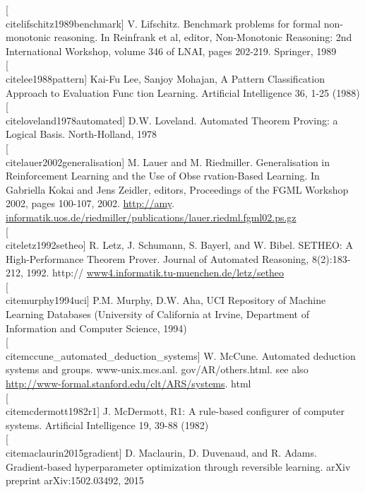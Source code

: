 \documentclass[10pt]{book}
\begin{document}
[\\cite{lifschitz1989benchmark}] V. Lifschitz. Benchmark problems for formal non-monotonic reasoning. In Reinfrank et al, editor, Non-Monotonic Reasoning: 2nd International Workshop, volume 346 of LNAI, pages 202-219. Springer, 1989\\[0pt]
[\\cite{lee1988pattern}] Kai-Fu Lee, Sanjoy Mohajan, A Pattern Classification Approach to Evaluation Func tion Learning. Artificial Intelligence 36, 1-25 (1988)\\[0pt]
[\\cite{loveland1978automated}] D.W. Loveland. Automated Theorem Proving: a Logical Basis. North-Holland, 1978\\[0pt]
[\\cite{lauer2002generalisation}] M. Lauer and M. Riedmiller. Generalisation in Reinforcement Learning and the Use of Obse rvation-Based Learning. In Gabriella Kokai and Jens Zeidler, editors, Proceedings of the FGML Workshop 2002, pages 100-107, 2002. \href{http://amy}{http://amy}. \href{http://informatik.uos.de/riedmiller/publications/lauer.riedml.fgml02.ps.gz}{informatik.uos.de/riedmiller/publications/lauer.riedml.fgml02.ps.gz}\\[0pt]
[\\cite{letz1992setheo}] R. Letz, J. Schumann, S. Bayerl, and W. Bibel. SETHEO: A High-Performance Theorem Prover. Journal of Automated Reasoning, 8(2):183-212, 1992. http:// \href{http://www4.informatik.tu-muenchen.de/letz/setheo}{www4.informatik.tu-muenchen.de/letz/setheo}\\[0pt]
[\\cite{murphy1994uci}] P.M. Murphy, D.W. Aha, UCI Repository of Machine Learning Databases (University of California at Irvine, Department of Information and Computer Science, 1994)\\[0pt]
[\\cite{mccune_automated_deduction_systems}] W. McCune. Automated deduction systems and groups. www-unix.mcs.anl. gov/AR/others.html. see also \href{http://www-formal.stanford.edu/clt/ARS/systems}{http://www-formal.stanford.edu/clt/ARS/systems}. html\\[0pt]
[\\cite{mcdermott1982r1}] J. McDermott, R1: A rule-based configurer of computer systems. Artificial Intelligence 19, 39-88 (1982)\\[0pt]
[\\cite{maclaurin2015gradient}] D. Maclaurin, D. Duvenaud, and R. Adams. Gradient-based hyperparameter optimization through reversible learning. arXiv preprint arXiv:1502.03492, 2015\\[0pt]
\end{document}

